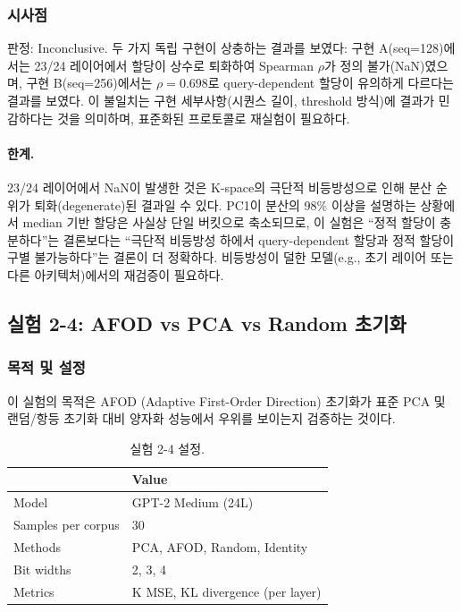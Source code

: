 \documentclass[11pt,a4paper]{article}
\begin{document}
\subsubsection{시사점}

판정: \textcolor{partial}{Inconclusive}.
두 가지 독립 구현이 상충하는 결과를 보였다: 구현 A(seq=128)에서는 23/24 레이어에서 할당이 상수로 퇴화하여 Spearman $\rho$가 정의 불가(NaN)였으며, 구현 B(seq=256)에서는 $\rho=0.698$로 query-dependent 할당이 유의하게 다르다는 결과를 보였다.
이 불일치는 구현 세부사항(시퀀스 길이, threshold 방식)에 결과가 민감하다는 것을 의미하며, 표준화된 프로토콜로 재실험이 필요하다.

\paragraph{한계.}
23/24 레이어에서 NaN이 발생한 것은 K-space의 극단적 비등방성으로 인해 분산 순위가 퇴화(degenerate)된 결과일 수 있다.
PC1이 분산의 98\% 이상을 설명하는 상황에서 median 기반 할당은 사실상 단일 버킷으로 축소되므로, 이 실험은 ``정적 할당이 충분하다''는 결론보다는 ``극단적 비등방성 하에서 query-dependent 할당과 정적 할당이 구별 불가능하다''는 결론이 더 정확하다.
비등방성이 덜한 모델(e.g., 초기 레이어 또는 다른 아키텍처)에서의 재검증이 필요하다.

\subsection{실험 2-4: AFOD vs PCA vs Random 초기화}

\subsubsection{목적 및 설정}

이 실험의 목적은 AFOD (Adaptive First-Order Direction) 초기화가 표준 PCA 및 랜덤/항등 초기화 대비 양자화 성능에서 우위를 보이는지 검증하는 것이다.

\begin{table}[H]
\centering
\caption{실험 2-4 설정.}
\label{tab:exp24_setup}
\begin{tabular}{ll}
\toprule
\textbf{} & \textbf{Value} \\
\midrule
Model & GPT-2 Medium (24L) \\
Samples per corpus & 30 \\
Methods & PCA, AFOD, Random, Identity \\
Bit widths & 2, 3, 4 \\
Metrics & K MSE, KL divergence (per layer) \\
\bottomrule
\end{tabular}
\end{table}
\end{document}
